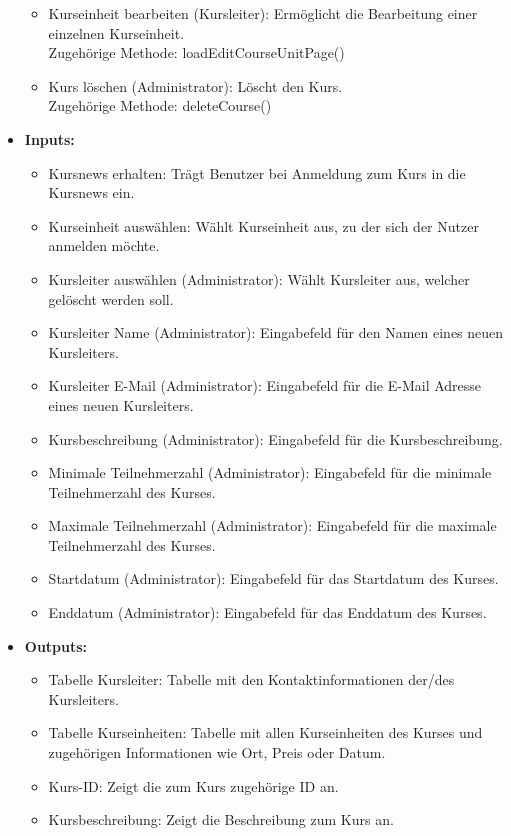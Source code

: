 \begin{itemize}
\begin{itemize}
								\item Kurseinheit bearbeiten (Kursleiter): Ermöglicht die Bearbeitung einer einzelnen Kurseinheit. \\ Zugehörige Methode: loadEditCourseUnitPage()
								\item Kurs löschen (Administrator): Löscht den Kurs. \\ Zugehörige Methode: deleteCourse()
							\end{itemize}
						\item \textbf{Inputs:}
							\begin{itemize}
								\item Kursnews erhalten: Trägt Benutzer bei Anmeldung zum Kurs in die Kursnews ein.
								\item Kurseinheit auswählen: Wählt Kurseinheit aus, zu der sich der Nutzer anmelden möchte.
								\item Kursleiter auswählen (Administrator): Wählt Kursleiter aus, welcher gelöscht werden soll.
								\item Kursleiter Name (Administrator): Eingabefeld für den Namen eines neuen Kursleiters.
								\item Kursleiter E-Mail (Administrator): Eingabefeld für die E-Mail Adresse eines neuen Kursleiters.
								\item Kursbeschreibung (Administrator): Eingabefeld für die Kursbeschreibung.
								\item Minimale Teilnehmerzahl (Administrator): Eingabefeld für die minimale Teilnehmerzahl des Kurses.
								\item Maximale Teilnehmerzahl (Administrator): Eingabefeld für die maximale Teilnehmerzahl des Kurses.
								\item Startdatum (Administrator): Eingabefeld für das Startdatum des Kurses.
								\item Enddatum (Administrator): Eingabefeld für das Enddatum des Kurses.
							\end{itemize}
						\item \textbf{Outputs:}
							\begin{itemize}
								\item Tabelle Kursleiter: Tabelle mit den Kontaktinformationen der/des Kursleiters.
								\item Tabelle Kurseinheiten: Tabelle mit allen Kurseinheiten des Kurses und zugehörigen Informationen wie Ort, Preis oder Datum.
								\item Kurs-ID: Zeigt die zum Kurs zugehörige ID an.
								\item Kursbeschreibung: Zeigt die Beschreibung zum Kurs an.

\end{itemize}
\end{itemize}

